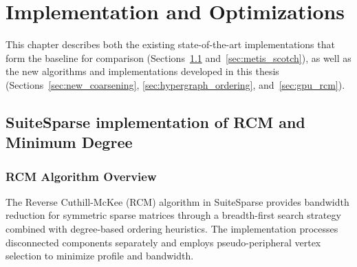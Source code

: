 \chapter{Implementation and Optimizations}
\label{ch:implementation_and_optimizations}

This chapter describes both the existing state-of-the-art implementations that form the baseline for comparison (Sections~\ref{sec:suitesparse} and~\ref{sec:metis_scotch}), as well as the new algorithms and implementations developed in this thesis (Sections~\ref{sec:new_coarsening}, \ref{sec:hypergraph_ordering}, and~\ref{sec:gpu_rcm}).

\section{SuiteSparse implementation of RCM and Minimum Degree}
\label{sec:suitesparse}

\subsection{RCM Algorithm Overview}
The Reverse Cuthill-McKee (RCM) algorithm in SuiteSparse \cite{davis_drtimothyaldendavissuitesparse_2025, noauthor_aldenmath_nodate} provides bandwidth reduction for symmetric sparse matrices through a breadth-first search strategy combined with degree-based ordering heuristics. The implementation processes disconnected components separately and employs pseudo-peripheral vertex selection to minimize profile and bandwidth.

